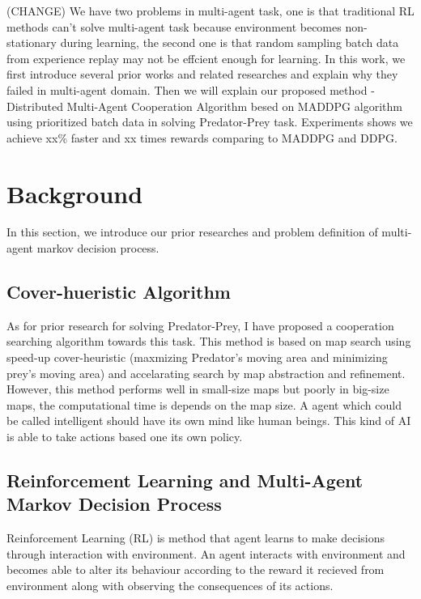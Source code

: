 \documentclass[11pt,twocolumn]{jarticle} %
\begin{document}
(CHANGE)
We have two problems in multi-agent task, one is that traditional RL methods can't solve multi-agent task because environment becomes non-stationary during learning, the second one is that random sampling batch data from experience replay may not be effcient enough for learning. In this work, we first introduce several prior works and related researches and explain why they failed in multi-agent domain. Then we will explain our proposed method - Distributed Multi-Agent Cooperation Algorithm besed on MADDPG algorithm\cite{maddpg} using prioritized batch data in solving Predator-Prey task. Experiments shows we achieve xx\% faster and xx times rewards comparing to MADDPG and DDPG.\par

\section{Background} 
In this section, we introduce our prior researches and problem definition of multi-agent markov decision process.
\subsection{Cover-hueristic Algorithm\cite{cover}}
As for prior research for solving Predator-Prey, I have proposed a cooperation searching algorithm towards this task. This method is based on map search using speed-up cover-heuristic \cite{cover-heuristic} (maxmizing Predator's moving area and minimizing prey's moving area) and accelarating search by map abstraction and refinement. However, this method performs well in small-size maps but poorly in big-size maps, the computational time is depends on the map size. A agent which could be called intelligent should have its own mind like human beings. This kind of AI is able to take actions based one its own policy.\par


\subsection{Reinforcement Learning and Multi-Agent Markov Decision Process}

Reinforcement Learning (RL) is method that agent learns to make decisions through interaction with environment. An agent interacts with environment and becomes able to alter its behaviour according to the reward it recieved from environment along with observing the consequences of its actions. \par
\end{document}
